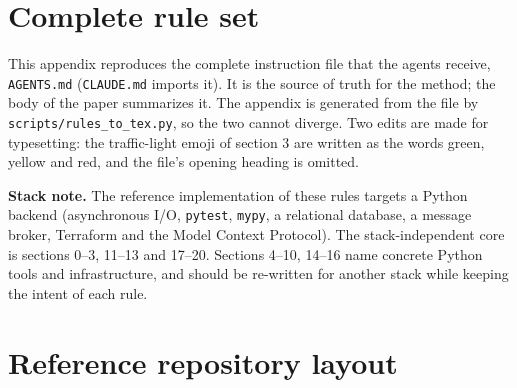 \documentclass[11pt,a4paper]{article}
\begin{document}
\appendix

\section{Complete rule set}
\label{app:rules}

This appendix reproduces the complete instruction file that the agents receive, \texttt{AGENTS.md} (\texttt{CLAUDE.md} imports it). It is the source of truth for the method; the body of the paper summarizes it. The appendix is generated from the file by \texttt{scripts/rules\_to\_tex.py}, so the two cannot diverge. Two edits are made for typesetting: the traffic-light emoji of section 3 are written as the words green, yellow and red, and the file's opening heading is omitted.

\medskip
\noindent\textbf{Stack note.} The reference implementation of these rules targets a Python backend (asynchronous I/O, \texttt{pytest}, \texttt{mypy}, a relational database, a message broker, Terraform and the Model Context Protocol). The stack-independent core is sections 0--3, 11--13 and 17--20. Sections 4--10, 14--16 name concrete Python tools and infrastructure, and should be re-written for another stack while keeping the intent of each rule.

\bigskip
\begingroup
\small
\setlength{\parskip}{3pt}

\endgroup

\section{Reference repository layout}
\label{app:layout}
\end{document}
